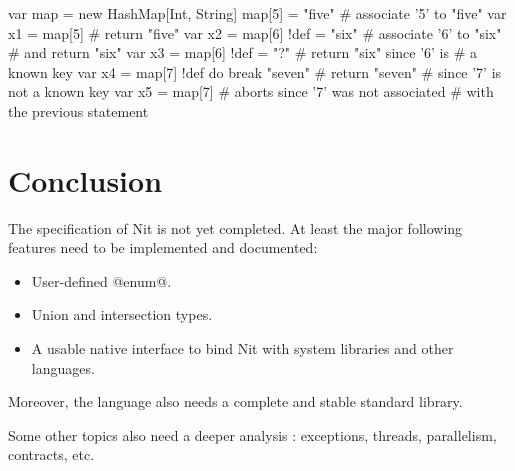 \begin{lst}
var map = new HashMap[Int, String]
map[5] = "five" # associate '5' to "five"
var x1 = map[5] # return "five"
var x2 = map[6] !def = "six" # associate '6' to "six" 
				# and return "six"
var x3 = map[6] !def = "?" # return "six" since '6' is
				# a known key
var x4 = map[7] !def do break "seven" # return "seven" 
				# since '7' is not a known key
var x5 = map[7] # aborts since '7' was not associated 
				# with the previous statement
\end{lst}

\section{Conclusion}

The specification of Nit is not yet completed.
At least the major following features need to be implemented and documented:
\begin{itemize}
\item User-defined @enum@.
\item Union and intersection types.
\item A usable native interface to bind Nit with system libraries and other languages.
\end{itemize}
Moreover, the language also needs a complete and stable standard library.

Some other topics also need a deeper analysis : exceptions, threads, parallelism, contracts, etc.

